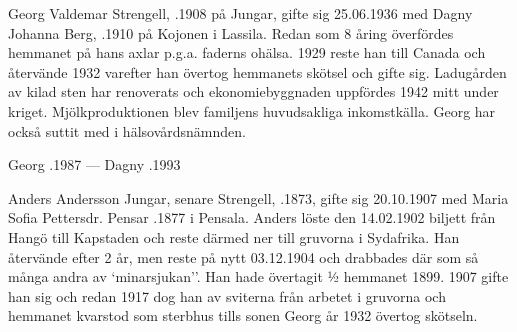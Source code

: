 


Georg Valdemar Strengell, .1908 på Jungar, gifte sig 25.06.1936 med Dagny Johanna Berg, .1910 på Kojonen i Lassila. Redan som 8 åring överfördes hemmanet på hans axlar p.g.a. faderns ohälsa. 1929 reste han till Canada och återvände 1932 varefter han övertog hemmanets skötsel och gifte sig. Ladugården av kilad sten har renoverats och ekonomiebyggnaden uppfördes 1942 mitt under kriget. Mjölkproduktionen blev familjens huvudsakliga inkomstkälla. Georg har också suttit med i hälsovårdsnämnden.
\begin{jhchildren}
  \item {}
  \item {}
  \item {}
  \item {}
\end{jhchildren}

Georg .1987  ---  Dagny .1993


Anders Andersson Jungar, senare Strengell, .1873, gifte sig 20.10.1907 med Maria Sofia Pettersdr. Pensar .1877 i Pensala. Anders löste den 14.02.1902 biljett från Hangö till Kapstaden och reste därmed ner till gruvorna i Sydafrika. Han återvände efter 2 år, men reste på nytt 03.12.1904 och drabbades där som så många andra av `minarsjukan''. Han hade övertagit ½  hemmanet 1899. 1907 gifte han sig och redan 1917 dog han av sviterna från arbetet i gruvorna och hemmanet kvarstod som sterbhus tills sonen Georg år 1932 övertog skötseln.
\begin{jhchildren}
  \item {}
  \item {}
  \item {}
  \item {}
  \item {}
\end{jhchildren}


